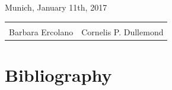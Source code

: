 \documentclass[10pt,fleqn,twoside]{article}
\begin{document}
\noindent Munich, January 11th, 2017\\[1em]

\noindent\begin{tabular}{p{5.5cm}p{5.5cm}}
\vspace{1em} & \\
Barbara Ercolano & Cornelis P. Dullemond \\
\end{tabular}
% 



%
\pagebreak[4]

%


\section{Bibliography}

\begingroup
\renewcommand{\section}[2]{}%


\endgroup
\end{document}
